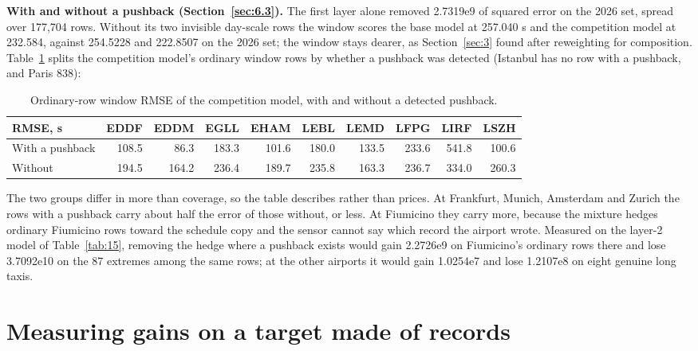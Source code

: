 \documentclass[
  manuscript=article,
  layout=preprint,
  year=2026,
  volume=x,
]{extra/joas}
\begin{document}
\textbf{With and without a pushback (Section~\ref{sec:6.3}).} The first layer alone removed 2.7319e9 of squared error on the 2026 set, spread over 177,704 rows. Without its two invisible day-scale rows the window scores the base model at 257.040 s and the competition model at 232.584, against 254.5228 and 222.8507 on the 2026 set; the window stays dearer, as Section~\ref{sec:3} found after reweighting for composition. Table~\ref{tab:23} splits the competition model's ordinary window rows by whether a pushback was detected (Istanbul has no row with a pushback, and Paris 838):

\begin{table}[htbp!]
  \centering
  \small
  \setlength{\tabcolsep}{5pt}\renewcommand{\arraystretch}{1.15}
  \caption{Ordinary-row window RMSE of the competition model, with and without a detected pushback.}
  \label{tab:23}
  \begin{tabular*}{\linewidth}{@{\extracolsep{\fill}}lrrrrrrrrr}
  \toprule
  \textbf{RMSE, s} & \textbf{EDDF} & \textbf{EDDM} & \textbf{EGLL} & \textbf{EHAM} & \textbf{LEBL} & \textbf{LEMD} & \textbf{LFPG} & \textbf{LIRF} & \textbf{LSZH} \\
  \midrule
  With a pushback & 108.5 & 86.3 & 183.3 & 101.6 & 180.0 & 133.5 & 233.6 & \cellcolor{recordtint}541.8 & 100.6 \\
  Without & 194.5 & 164.2 & 236.4 & 189.7 & 235.8 & 163.3 & 236.7 & 334.0 & 260.3 \\
  \bottomrule
  \end{tabular*}
\end{table}

The two groups differ in more than coverage, so the table describes rather than prices. At Frankfurt, Munich, Amsterdam and Zurich the rows with a pushback carry about half the error of those without, or less. At Fiumicino they carry more, because the mixture hedges ordinary Fiumicino rows toward the schedule copy and the sensor cannot say which record the airport wrote. Measured on the layer-2 model of Table~\ref{tab:15}, removing the hedge where a pushback exists would gain 2.2726e9 on Fiumicino's ordinary rows there and lose 3.7092e10 on the 87 extremes among the same rows; at the other airports it would gain 1.0254e7 and lose 1.2107e8 on eight genuine long taxis.

\section{Measuring gains on a target made of records}\label{sec:E}
\end{document}
